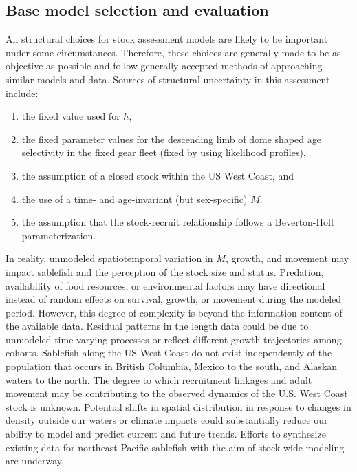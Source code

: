 \documentclass[11pt,
  english,
  a4paper,
]{article}
\begin{document}

\hypertarget{base-model-selection-and-evaluation}{%
\subsection{Base model selection and evaluation}\label{base-model-selection-and-evaluation}}

\leavevmode\tagmcend\tagstructend

All structural choices for stock assessment models are likely to be important under some circumstances. Therefore, these choices are generally made to be as objective as possible and follow generally accepted methods of approaching similar models and data. Sources of structural uncertainty in this assessment include:

\begin{enumerate}
\item the fixed value used for $h$,
\item  the fixed parameter values for the descending limb of dome shaped age selectivity in the fixed gear fleet (fixed by using likelihood profiles),
\item the assumption of a closed stock within the US West Coast, and
\item the use of a time- and age-invariant (but sex-specific) $M$.
\item the assumption that the stock-recruit relationship follows a Beverton-Holt parameterization.
\end{enumerate}


In reality, unmodeled spatiotemporal variation in {\(M\)\leavevmode\tagmcend\tagstructend}, growth, and movement may impact sablefish and the perception of the stock size and status. Predation, availability of food resources, or environmental factors may have directional instead of random effects on survival, growth, or movement during the modeled period. However, this degree of complexity is beyond the information content of the available data. Residual patterns in the length data could be due to unmodeled time-varying processes or reflect different growth trajectories among cohorts. Sablefish along the US West Coast do not exist independently of the population that occurs in British Columbia, Mexico to the south, and Alaskan waters to the north. The degree to which recruitment linkages and adult movement may be contributing to the observed dynamics of the U.S. West Coast stock is unknown. Potential shifts in spatial distribution in response to changes in density outside our waters or climate impacts could substantially reduce our ability to model and predict current and future trends. Efforts to synthesize existing data for northeast Pacific sablefish with the aim of stock-wide modeling are underway.
\end{document}
